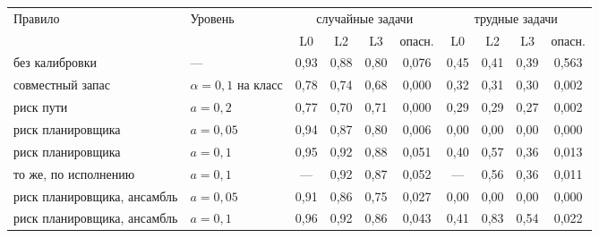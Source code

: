 \begin{tabular}{ll|ccc|c|ccc|c}
\toprule
Правило & Уровень & \multicolumn{4}{c|}{случайные задачи} & \multicolumn{4}{c}{трудные задачи} \\
 & & L0 & L2 & L3 & опасн. & L0 & L2 & L3 & опасн. \\
\midrule
без калибровки & --- & 0{,}93 & 0{,}88 & 0{,}80 & 0{,}076 & 0{,}45 & 0{,}41 & 0{,}39 & 0{,}563 \\
совместный запас & $\alpha = 0{,}1$ на класс & 0{,}78 & 0{,}74 & 0{,}68 & 0{,}000 & 0{,}32 & 0{,}31 & 0{,}30 & 0{,}002 \\
риск пути & $a = 0{,}2$ & 0{,}77 & 0{,}70 & 0{,}71 & 0{,}000 & 0{,}29 & 0{,}29 & 0{,}27 & 0{,}002 \\
риск планировщика & $a = 0{,}05$ & 0{,}94 & 0{,}87 & 0{,}80 & 0{,}006 & 0{,}00 & 0{,}00 & 0{,}00 & 0{,}000 \\
риск планировщика & $a = 0{,}1$ & 0{,}95 & 0{,}92 & 0{,}88 & 0{,}051 & 0{,}40 & 0{,}57 & 0{,}36 & 0{,}013 \\
то же, по исполнению & $a = 0{,}1$ & --- & 0{,}92 & 0{,}87 & 0{,}052 & --- & 0{,}56 & 0{,}36 & 0{,}011 \\
риск планировщика, ансамбль & $a = 0{,}05$ & 0{,}91 & 0{,}86 & 0{,}75 & 0{,}027 & 0{,}00 & 0{,}00 & 0{,}00 & 0{,}000 \\
риск планировщика, ансамбль & $a = 0{,}1$ & 0{,}96 & 0{,}92 & 0{,}86 & 0{,}043 & 0{,}41 & 0{,}83 & 0{,}54 & 0{,}022 \\
\bottomrule
\end{tabular}
